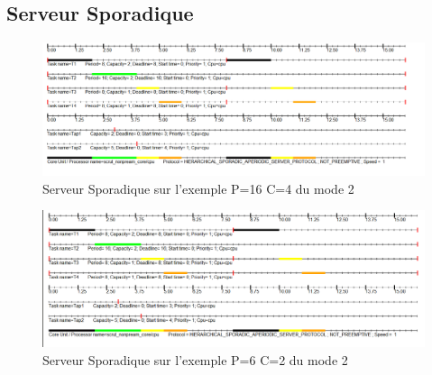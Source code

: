 {  \subsection{Serveur Sporadique}{
    \begin{figure}[H]
      \centering
      \includegraphics[width=16cm]{
        img/mode2/spo/spo_p16_c4.png
      }
      \caption{Serveur Sporadique sur l'exemple P=16 C=4 du mode 2}
    \end{figure}

    \begin{figure}[H]
      \centering
      \includegraphics[width=16cm]{
        img/mode2/spo/spo_p6_c2.png
      }
      \caption{Serveur Sporadique sur l'exemple P=6 C=2 du mode 2}
    \end{figure}
  }
 }

\newpage